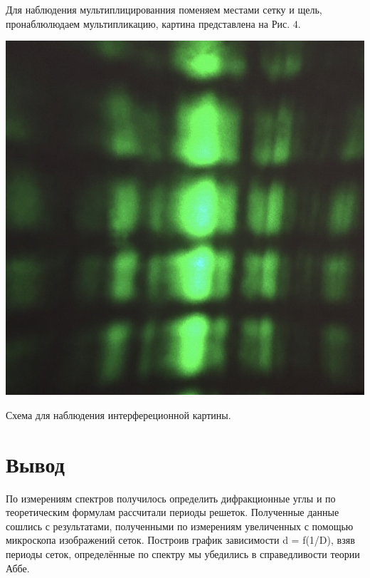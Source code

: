  
 \begin{minipage}{0.47\textwidth}
\begin{center}
 Для наблюдения мультиплицированния поменяем местами сетку и щель, пронаблюлюдаем мультипликацию, картина представлена на Рис. $4 .$

\end{center}
\end{minipage}
\begin{minipage}{0.47\textwidth}
\begin{center}

\includegraphics[width = \textwidth]{5.JPG}
\end{center}

\begin{center}
Схема для наблюдения интерфереционной картины.

\end{center}
\end{minipage}
\section{Вывод}


По измерениям спектров получилось определить дифракционные углы и по теоретическим формулам рассчитали периоды решеток. Полученные данные сошлись с результатами,  полученными по измерениям увеличенных с помощью микроскопа изображений сеток. Построив график зависимости d = f(1/D), взяв периоды сеток, определённые по спектру мы убедились в справедливости теории Аббе. 



